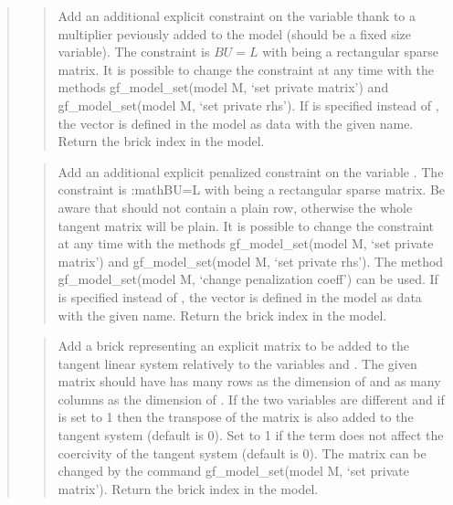 \documentclass[a4paper,11pt,english]{sphinxmanual}
\begin{document}
\begin{quote}
\begin{quote}

Add an additional explicit constraint on the variable  thank to
a multiplier  peviously added to the model (should be a fixed
size variable). The constraint is \(BU=L\)
with  being a rectangular sparse matrix. It is possible to change
the constraint at any time with the methods gf\_model\_set(model M, ‘set private matrix’)
and gf\_model\_set(model M, ‘set private rhs’). If  is specified instead of ,
the vector  is defined in the model as data with the given name.
Return the brick index in the model.
\end{quote}

\begin{quote}

Add an additional explicit penalized constraint on the variable .
The constraint is :math\textasciigrave{}BU=L\textasciigrave{} with  being a rectangular sparse matrix.
Be aware that  should not contain a plain row, otherwise the whole
tangent matrix will be plain. It is possible to change the constraint
at any time with the methods gf\_model\_set(model M, ‘set private matrix’)
and gf\_model\_set(model M, ‘set private rhs’). The method
gf\_model\_set(model M, ‘change penalization coeff’) can be used.
If  is specified instead of , the vector  is defined
in the model as data with the given name.
Return the brick
index in the model.
\end{quote}

\begin{quote}

Add a brick representing an explicit matrix to be added to the tangent
linear system relatively to the variables  and .
The given matrix should have has many rows as the dimension of
 and as many columns as the dimension of .
If the two variables are different and if  is set to 1
then the transpose of the matrix is also added to the tangent system
(default is 0). Set  to 1 if the term does not affect the
coercivity of the tangent system (default is 0). The matrix can be
changed by the command gf\_model\_set(model M, ‘set private matrix’). Return the
brick index in the model.
\end{quote}


\end{quote}
\end{document}
